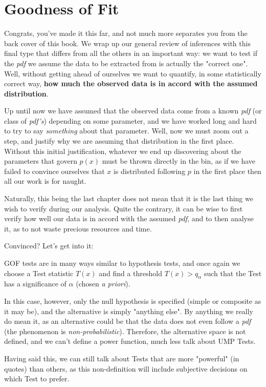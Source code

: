 \chapter{Goodness of Fit}

Congrats, you've made it this far, and not much more separates you from the back cover of this book. We wrap up our general review of inferences with this final type that differs from all the others in an important way: we want to test if the \emph{pdf} we assume the data to be extracted from is actually the "correct one". Well, without getting ahead of ourselves we want to quantify, in some statistically correct way, \textbf{how much the observed data is in accord with the assumed distribution}. 

Up until now we have assumed that the observed data come from a known \emph{pdf} (or class of \emph{pdf's}) depending on some parameter, and we have worked long and hard to try to say \emph{something} about that parameter. Well, now we must zoom out a step, and justify why we are assuming that distribution in the first place. Without this initial justification, whatever we end up discovering about the parameters that govern $p(x)$ must be thrown directly in the bin, as if we have failed to convince ourselves that $x$ is distributed following $p$ in the first place then all our work is for naught.

Naturally, this being the last chapter does not mean that it is the last thing we wish to verify during our analysis. Quite the contrary, it can be wise to first verify how well our data is in accord with the assumed \emph{pdf}, and to then analyse it, as to not waste precious resources and time.

Convinced? Let's get into it:

GOF tests are in many ways similar to hypothesis tests, and once again we choose a Test statistic $T(x)$ and find a threshold $T(x)>q_\alpha$ such that the Test has a significance of $\alpha$ (chosen \emph{a priori}).

In this case, however, only the null hypothesis is specified (simple or composite as it may be), and the alternative is simply "anything else". By anything we really do mean it, as an alternative could be that the data does not even follow a \emph{pdf} (the phenomenon is \emph{non-probabilistic}). Therefore, the alternative space is not defined, and we can't define a power function, much less talk about UMP Tests.

Having said this, we can still talk about Tests that are more "powerful" (in quotes) than others, as this non-definition will include subjective decisions on which Test to prefer.

